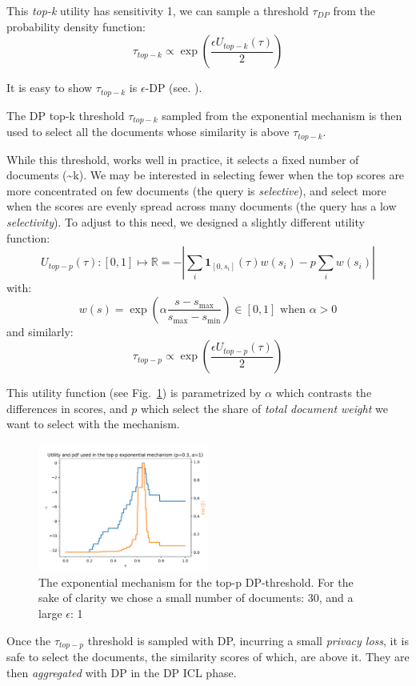 \documentclass[conference]{IEEEtran}
\begin{document}
This \emph{top-k} utility has sensitivity 1, we can sample a threshold
\(\tau_{DP}\) from the probability density function:
\[\tau_{top-k}\propto\exp\left(\frac{\epsilon U_{top-k}(\tau)}{2}\right)\]

It is easy to show \(\tau_{top-k}\) is \(\epsilon\)-DP (see. \cite{ref-dwork2014algorithmic}).

The DP top-k threshold \(\tau_{top-k}\) sampled from the exponential
mechanism is then used to select all the documents whose similarity is
above \(\tau_{top-k}\).

While this threshold, works well in practice, it selects a fixed number
of documents (\textasciitilde k). We may be interested in selecting
fewer when the top scores are more concentrated on few documents (the
query is \emph{selective}), and select more when the scores are evenly
spread across many documents (the query has a low \emph{selectivity}).
To adjust to this need, we designed a slightly different utility
function:
\[U_{top-p}(\tau): [0, 1] \mapsto \mathbb{R} = -\left|\sum_i\mathbf{1}_{[0, s_i]}(\tau)w(s_i)-p\sum_i w(s_i)\right|\]
with:
\[w(s) = \exp\left(\alpha\frac{s-s_{\max}}{s_{\max}-s_{\min}}\right) \in [0, 1] \text{ when } \alpha>0\]
and similarly:
\[\tau_{top-p}\propto\exp\left(\frac{\epsilon U_{top-p}(\tau)}{2}\right)\]

This utility function (see Fig.~\ref{fig:toppexp}) is parametrized by
\(\alpha\) which contrasts the differences in scores, and \(p\) which
select the share of \emph{total document weight} we want to select with
the mechanism.

\begin{figure}
\centering
\includegraphics[width=0.5\textwidth]{figures/top-p-exp.pdf}
\caption{The exponential mechanism for the top-p DP-threshold. For the
sake of clarity we chose a small number of documents: 30, and a large
\(\epsilon\): 1}\label{fig:toppexp}
\end{figure}

Once the \(\tau_{top-p}\) threshold is sampled with DP, incurring a
small \emph{privacy loss}, it is safe to select the documents, the
similarity scores of which, are above it. They are then
\emph{aggregated} with DP in the DP ICL phase.
\end{document}

